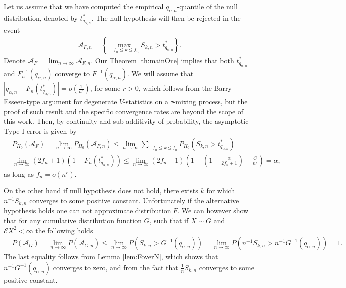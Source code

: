 \documentclass{article} %
\newcommand{\ev}{\mathcal{E}}
\begin{document}
Let us assume that we have computed the empirical $q_{\alpha,n}$-quantile of the null distribution, denoted by $t^*_{q_{\alpha,n}}$. The null hypothesis will then be rejected in the event
\begin{align*}
\mathcal A_{F,n} = \left\{ \max_{-f_n \leq k \leq f_n} S_{k,n} > t^*_{q_{\alpha,n}} \right\}.
\end{align*}  
Denote $\mathcal A_F = \lim_{n \to \infty} \mathcal A_{F,n}$. Our Theorem \ref{th:mainOne} implies that both $t^*_{q_{\alpha,n}}$ and $F_n^{-1}(q_{\alpha,n})$ converge to $F^{-1}(q_{\alpha,n})$. We will assume that $|q_{\alpha,n}-F_n(t^*_{q_{\alpha,n}})|=o(\frac{1}{n^r})$, for some $r>0$, which follows from the Barry-Esseen-type argument for degenerate $V$-statistics on a $\tau$-mixing process, but the proof of such result and the specific convergence rates are beyond the scope of this work. Then, by continuity and sub-additivity of probability, the asymptotic Type I error is given by 
\begin{align}
\label{eq:type1}
&P_{H_0}(\mathcal A_F) = \lim_{n \to \infty} P_{H_0}( \mathcal A_{F,n}) \leq \lim_{n \to \infty}  \sum_{-f_n \leq k \leq f_n} P_{H_0}(S_{k,n} >t^*_{q_{\alpha,n}}) = \\  
&\lim_{n \to \infty} (2f_n+1) \left(1-F_n(t^*_{q_{\alpha,n}})\right) \leq \lim_{n \to \infty} (2f_n+1) \left( 1 - (1-\frac{\alpha}{2f_n+1}) + \frac C {n^r}\right)= \alpha, 
\end{align}
as long as $f_n=o(n^r)$. %
 
On the other hand if null hypothesis does not hold, there exists $k$ for which $n^{-1} S_{k,n}$ converges to some positive constant. Unfortunately if the alternative hypothesis holds one can not approximate distribution $F$. We can however show that for any cumulative distribution function $G$, such that if $X \sim G$ and $\ev X^2 < \infty$ the following holds 
\begin{align*}
&P(\mathcal A_G) = \lim_{n \to \infty} P(\mathcal A_{G,n}) \leq \lim_{n \to \infty} P( S_{k,n} > G^{-1}(q_{\alpha,n}) ) = \lim_{n \to \infty} P( n^{-1} S_{k,n} > n^{-1} G^{-1}(q_{\alpha,n}) ) =1.
\end{align*}
The last equality follows from Lemma  \ref{lem:FoverN}, which shows that $n^{-1} G^{-1}(q_{\alpha,n})$ converges to zero, and from the fact that  $\frac 1 n S_{k,n}$ converges to some positive constant.  
\end{document}
